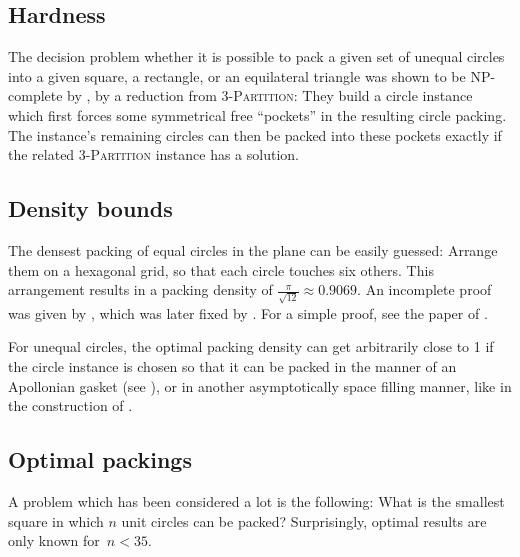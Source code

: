 \documentclass[a4paper,style=print,oneside,bibliography=totoc,nexus,lnum,extramargin]{tubsbook}
\begin{document}

\subsection{Hardness}

The decision problem whether it is possible to pack a given set of unequal circles into a given square, a rectangle, or an equilateral triangle was shown to be NP-complete by \textcite{DFL2010circle}, by a reduction from \textsc{3-Partition}: They build a circle instance which first forces some symmetrical free “pockets” in the resulting circle packing. The instance's remaining circles can then be packed into these pockets exactly if the related \textsc{3-Partition} instance has a solution.

\subsection{Density bounds}

The densest packing of equal circles in the plane can be easily guessed: Arrange them on a hexagonal grid, so that each circle touches six others. This arrangement results in a packing density of $\frac{\pi}{\sqrt{12}} \approx 0.9069$. An incomplete proof was given by \textcite{thue1892om}, which was later fixed by \textcite{fejestoth1940uber}. For a simple proof, see the paper of \textcite{CW2010simple}.

For unequal circles, the optimal packing density can get arbitrarily close to 1 if the circle instance is chosen so that it can be packed in the manner of an Apollonian gasket (see ), or in another asymptotically space filling manner, like in the construction of \textcite{bourke2011random}.


\subsection{Optimal packings}

A problem which has been considered a lot is the following: What is the smallest square in which $n$ unit circles can be packed?
Surprisingly, optimal results are only known for~$n < 35$.
\end{document}
